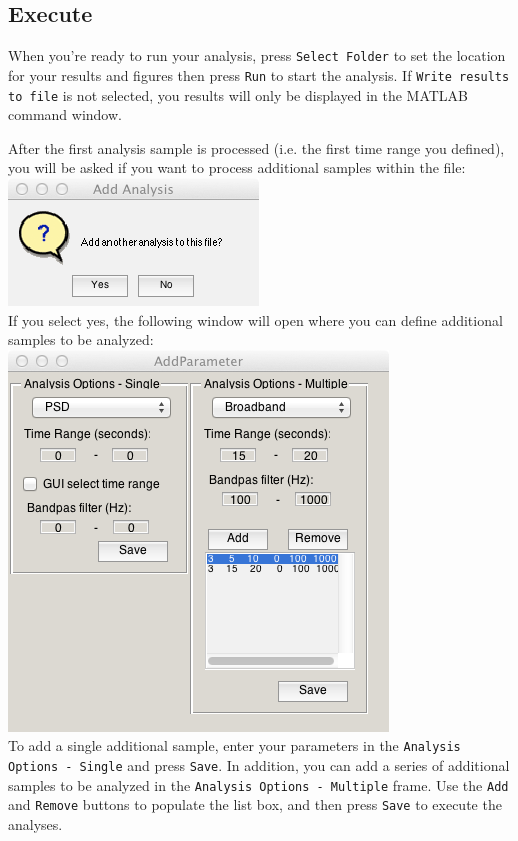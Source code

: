 \documentclass[11pt]{report}
\begin{document}
\subsection{Execute} \label{Execute}

When you're ready to run your analysis, press \texttt{Select Folder} to set the location for your results and figures then press \texttt{Run} to start the analysis.  If \texttt{Write results to file} is not selected, you results will only be displayed in the MATLAB command window.

After the first analysis sample is processed (i.e. the first time range you defined), you will be asked if you want to process additional samples within the file:\\

\includegraphics[scale=0.6,clip = true,trim = 0 0 0 0]{4.png}\\

If you select yes, the following window will open where you can define  additional samples to be analyzed:\\

\includegraphics[scale=0.6,clip = true,trim = 0 0 0 0]{5.png}\\

To add a single additional sample, enter your parameters in the \texttt{Analysis Options - Single} and press \texttt{Save}.  In addition, you can add a series of additional samples to be analyzed in the \texttt{Analysis Options - Multiple} frame.  Use the \texttt{Add} and \texttt{Remove} buttons to populate the list box, and then press \texttt{Save} to execute the analyses.
\end{document}
